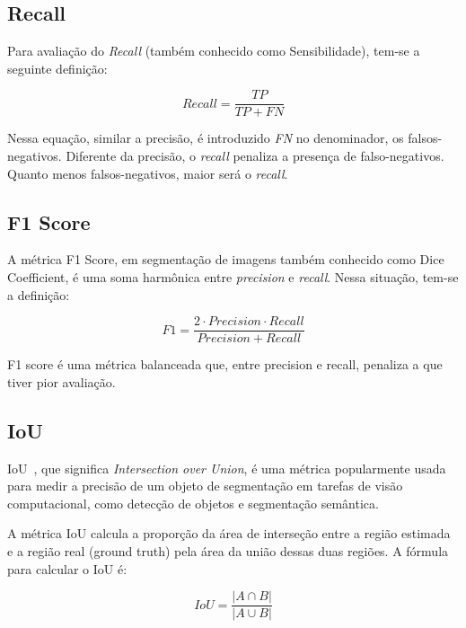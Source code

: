 \subsection{Recall}\label{sec:recall}

Para avaliação do \textit{Recall} (também conhecido como Sensibilidade), tem-se a seguinte definição:

\begin{equation}\label{eq:recall}
  Recall = \dfrac{TP}{TP + FN}
\end{equation}

Nessa equação, similar a precisão, é introduzido \textit{FN} no denominador,
os falsos-negativos. Diferente da precisão, o \textit{recall} penaliza
a presença de falso-negativos. Quanto menos falsos-negativos, maior
será o \textit{recall}.

\subsection{F1 Score}\label{sec:f1}

A métrica F1 Score, em segmentação de imagens também conhecido como
Dice Coefficient, é uma soma harmônica entre \textit{precision} e
\textit{recall}. Nessa situação, tem-se a definição:


\begin{equation}\label{eq:recall}
  F1 = \dfrac{2 \cdot Precision \cdot Recall}{Precision + Recall}
\end{equation}

F1 score é uma métrica balanceada que, entre precision e recall,
penaliza a que tiver pior avaliação.

\subsection{IoU}\label{sec:iou}

IoU~\cite{rezatofighi2019generalized}, que significa
\textit{Intersection over Union}, é uma métrica popularmente usada
para medir a precisão de um objeto de segmentação em tarefas de visão
computacional, como detecção de objetos e segmentação semântica.

A métrica IoU calcula a proporção da área de interseção entre a região
estimada e a região real (ground truth) pela área da união dessas duas
regiões. A fórmula para calcular o IoU é:

\begin{equation}\label{eq:iou}
  IoU = \dfrac{\left| A \cap B \right|}{\left| A \cup B \right|}
\end{equation}


